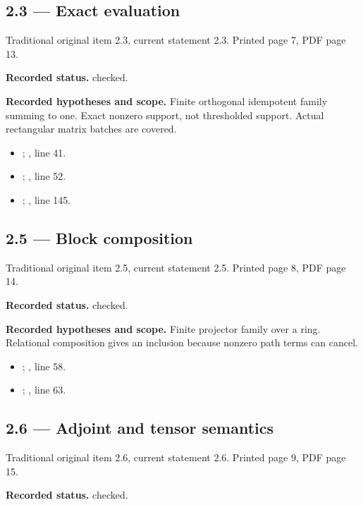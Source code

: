 \subsection{2.3 — Exact evaluation}
\label{result:2.3}
{\footnotesize\color{muted}Traditional original item 2.3, current statement 2.3. Printed page 7, PDF page 13.}\par
\textbf{Recorded status.} checked.

\textbf{Recorded hypotheses and scope.} Finite orthogonal idempotent family summing to one. Exact nonzero support, not thresholded support. Actual rectangular matrix batches are covered.

\begin{itemize}
\item {}; , line 41.
\item {}; , line 52.
\item {}; , line 145.
\end{itemize}
\subsection{2.5 — Block composition}
\label{result:2.5}
{\footnotesize\color{muted}Traditional original item 2.5, current statement 2.5. Printed page 8, PDF page 14.}\par
\textbf{Recorded status.} checked.

\textbf{Recorded hypotheses and scope.} Finite projector family over a ring. Relational composition gives an inclusion because nonzero path terms can cancel.

\begin{itemize}
\item {}; , line 58.
\item {}; , line 63.
\end{itemize}
\subsection{2.6 — Adjoint and tensor semantics}
\label{result:2.6}
{\footnotesize\color{muted}Traditional original item 2.6, current statement 2.6. Printed page 9, PDF page 15.}\par
\textbf{Recorded status.} checked.

